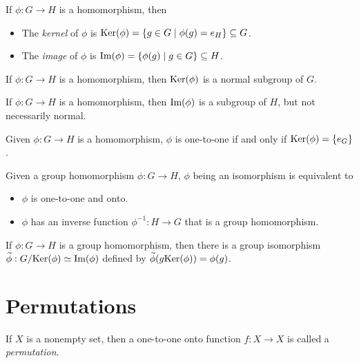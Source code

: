 \begin{definition}
	If $\phi : G \rightarrow H$ is a homomorphism, then
	\begin{itemize}
		\item The \emph{kernel} of $\phi$ is $\text{Ker}(\phi) = \{g \in G \mid \phi(g) =
			e_H\} \subseteq G$.
		\item The \emph{image} of $\phi$ is $\text{Im}(\phi) = \{\phi(g) \mid g \in
			G\} \subseteq H$.
	\end{itemize}
\end{definition}

\begin{theorem}
	If $\phi : G \rightarrow H$ is a homomorphism, then $\text{Ker}(\phi)$ is a normal
	subgroup of $G$.
\end{theorem}

\begin{theorem}
	If $\phi : G \rightarrow H$ is a homomorphism, then $\text{Im}(\phi)$ is a
	subgroup of $H$, but not necessarily normal.
\end{theorem}

\begin{theorem}
	Given $\phi : G \rightarrow H$ is a homomorphism, $\phi$ is one-to-one if and
	only if $\text{Ker}(\phi) = \{e_G\}$.
\end{theorem}

\begin{theorem}
	Given a group homomorphism $\phi : G \rightarrow H$, $\phi$ being an
	isomorphism is equivalent to
	\begin{itemize}
		\item $\phi$ is one-to-one and onto.
		\item $\phi$ has an inverse function $\phi^{-1} : H \rightarrow G$ that is a
			group homomorphism.
	\end{itemize}
\end{theorem}

\begin{theorem}
	If $\phi : G \rightarrow H$ is a group homomorphism, then there is a group
	isomorphism $\widetilde{\phi} : G/\text{Ker}(\phi) \simeq \text{Im}(\phi)$ defined
	by $\widetilde{\phi}(g \text{Ker}(\phi)) = \phi(g)$.
\end{theorem}

\section*{Permutations}

\begin{definition}
	If $X$ is a nonempty set, then a one-to-one onto function $f : X \rightarrow
	X$ is called a \emph{permutation}.
\end{definition}

